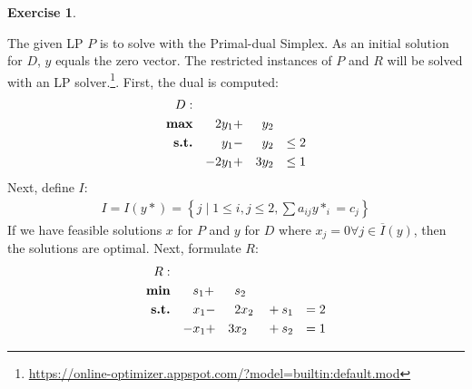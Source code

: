 \documentclass[a4paper,12pt,headsepline]{scrartcl}
\newtheorem{aufgabe}{Exercise}
\begin{document}
\newpage
\begin{aufgabe}
\end{aufgabe}
The given LP $P$ is to solve with the Primal-dual Simplex. As an initial solution for $D$, $y$ equals the zero vector. The restricted instances of $P$ and $R$ will be solved with an LP solver.\footnote{\hyperlink{https://online-optimizer.appspot.com/?model=builtin:default.mod}{https://online-optimizer.appspot.com/?model=builtin:default.mod}}. First, the dual is computed:
\begin{align*}D:\\
\textbf{\text{max}} & &2&y_1 + &&y_2 &\\
\textbf{\text{s.t.}} & &&y_1 - &&y_2 & \leq 2\\
& &-2&y_1 + &3&y_2 & \leq 1
\end{align*}
Next, define $I$:
\begin{align*}
I = I(y*) = \left\{ j\mid 1 \leq i,j \leq 2, \sum a_{ij}y*_i =c_j \right\} 
\end{align*}
If we have feasible solutions $x$ for $P$ and $y$ for $D$ where $x_j=0 \forall j\in \overline{I}(y)$, then the solutions are optimal. Next, formulate $R$:
\begin{align*}R:\\
\textbf{\text{min}} & &&s_1 + &&s_2 &&&\\
\textbf{\text{s.t.}} & &&x_1 - &&2x_2 &&+s_1 &= 2\\
& &-&x_1 + &3&x_2 && + s_2 & = 1
\end{align*}
\end{document}
